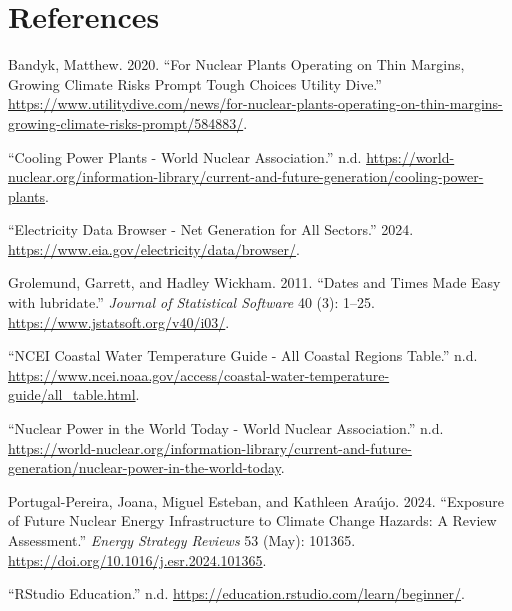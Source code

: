 \documentclass[
  letterpaper,
  DIV=11,
  numbers=noendperiod]{scrreprt}
\newlength{\cslhangindent}
\newenvironment{CSLReferences}[2] %
 {\begin{list}{}{%
  \setlength{\itemindent}{0pt}
  \setlength{\leftmargin}{0pt}
  \setlength{\parsep}{0pt}
  \ifodd #1
   \setlength{\leftmargin}{\cslhangindent}
   \setlength{\itemindent}{-1\cslhangindent}
  \fi
  \setlength{\itemsep}{#2\baselineskip}}}
 {\end{list}}
\begin{document}

\chapter*{References}\label{references}


\label{refs}
\begin{CSLReferences}{1}{0}
Bandyk, Matthew. 2020. {``For Nuclear Plants Operating on Thin Margins,
Growing Climate Risks Prompt Tough Choices \textbar{} Utility Dive.''}
\url{https://www.utilitydive.com/news/for-nuclear-plants-operating-on-thin-margins-growing-climate-risks-prompt/584883/}.

{``Cooling Power Plants - World Nuclear Association.''} n.d.
\url{https://world-nuclear.org/information-library/current-and-future-generation/cooling-power-plants}.

{``Electricity Data Browser - Net Generation for All Sectors.''} 2024.
\url{https://www.eia.gov/electricity/data/browser/}.

Grolemund, Garrett, and Hadley Wickham. 2011. {``Dates and Times Made
Easy with {lubridate}.''} \emph{Journal of Statistical Software} 40 (3):
1--25. \url{https://www.jstatsoft.org/v40/i03/}.

{``NCEI Coastal Water Temperature Guide - All Coastal Regions Table.''}
n.d.
\url{https://www.ncei.noaa.gov/access/coastal-water-temperature-guide/all_table.html}.

{``Nuclear Power in the World Today - World Nuclear Association.''} n.d.
\url{https://world-nuclear.org/information-library/current-and-future-generation/nuclear-power-in-the-world-today}.

Portugal-Pereira, Joana, Miguel Esteban, and Kathleen Araújo. 2024.
{``Exposure of Future Nuclear Energy Infrastructure to Climate Change
Hazards: A Review Assessment.''} \emph{Energy Strategy Reviews} 53
(May): 101365. \url{https://doi.org/10.1016/j.esr.2024.101365}.

{``RStudio Education.''} n.d.
\url{https://education.rstudio.com/learn/beginner/}.


\end{CSLReferences}
\end{document}
